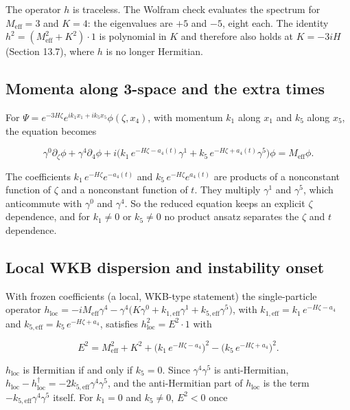 \documentclass[11pt]{article}
\begin{document}
The operator $h$ is traceless. The Wolfram check evaluates the spectrum for $M_{\mathrm{eff}}=3$ and $K=4$: the eigenvalues are $+5$ and $-5$, eight each. The identity $h^2=(M_{\mathrm{eff}}^2+K^2)\cdot1$ is polynomial in $K$ and therefore also holds at $K=-3iH$ (Section 13.7), where $h$ is no longer Hermitian.

\subsection{Momenta along 3-space and the extra times}

For $\Psi=e^{-3H\zeta}e^{ik_1x_1+ik_5x_5}\phi(\zeta,x_4)$, with momentum $k_1$ along $x_1$ and $k_5$ along $x_5$, the equation becomes

\[
\gamma^0\partial_\zeta\phi+\gamma^4\partial_4\phi+i\bigl(k_1\,e^{-H\zeta-a_4(t)}\gamma^1+k_5\,e^{-H\zeta+a_4(t)}\gamma^5\bigr)\phi=M_{\mathrm{eff}}\phi .
\]

The coefficients $k_1\,e^{-H\zeta}e^{-a_4(t)}$ and $k_5\,e^{-H\zeta}e^{a_4(t)}$ are products of a nonconstant function of $\zeta$ and a nonconstant function of $t$. They multiply $\gamma^1$ and $\gamma^5$, which anticommute with $\gamma^0$ and $\gamma^4$. So the reduced equation keeps an explicit $\zeta$ dependence, and for $k_1\ne0$ or $k_5\ne0$ no product ansatz separates the $\zeta$ and $t$ dependence.

\subsection{Local WKB dispersion and instability onset}

With frozen coefficients (a local, WKB-type statement) the single-particle operator $h_{\mathrm{loc}}=-iM_{\mathrm{eff}}\gamma^4-\gamma^4\bigl(K\gamma^0+k_{1,\mathrm{eff}}\gamma^1+k_{5,\mathrm{eff}}\gamma^5\bigr)$, with $k_{1,\mathrm{eff}}=k_1\,e^{-H\zeta-a_4}$ and $k_{5,\mathrm{eff}}=k_5\,e^{-H\zeta+a_4}$, satisfies $h_{\mathrm{loc}}^2=E^2\cdot1$ with

\[
E^2=M_{\mathrm{eff}}^2+K^2+\bigl(k_1\,e^{-H\zeta-a_4}\bigr)^2-\bigl(k_5\,e^{-H\zeta+a_4}\bigr)^2 .
\]

$h_{\mathrm{loc}}$ is Hermitian if and only if $k_5=0$. Since $\gamma^4\gamma^5$ is anti-Hermitian, $h_{\mathrm{loc}}-h_{\mathrm{loc}}^\dagger=-2k_{5,\mathrm{eff}}\gamma^4\gamma^5$, and the anti-Hermitian part of $h_{\mathrm{loc}}$ is the term $-k_{5,\mathrm{eff}}\gamma^4\gamma^5$ itself. For $k_1=0$ and $k_5\ne0$, $E^2<0$ once
\end{document}
